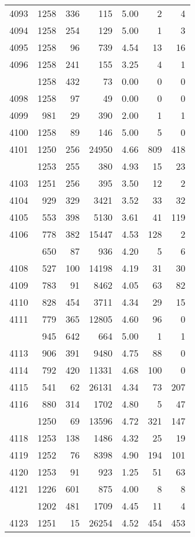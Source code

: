 \documentclass[
]{article}
\begin{document}
\begin{table}
\begin{tabular}[t]{lrrrrrr}
4093 & 1258 & 336 & 115 & 5.00 & 2 & 4\\
4094 & 1258 & 254 & 129 & 5.00 & 1 & 3\\
4095 & 1258 & 96 & 739 & 4.54 & 13 & 16\\
4096 & 1258 & 241 & 155 & 3.25 & 4 & 1\\
\addlinespace
4097 & 1258 & 432 & 73 & 0.00 & 0 & 0\\
4098 & 1258 & 97 & 49 & 0.00 & 0 & 0\\
4099 & 981 & 29 & 390 & 2.00 & 1 & 1\\
4100 & 1258 & 89 & 146 & 5.00 & 5 & 0\\
4101 & 1250 & 256 & 24950 & 4.66 & 809 & 418\\
\addlinespace
4102 & 1253 & 255 & 380 & 4.93 & 15 & 23\\
4103 & 1251 & 256 & 395 & 3.50 & 12 & 2\\
4104 & 929 & 329 & 3421 & 3.52 & 33 & 32\\
4105 & 553 & 398 & 5130 & 3.61 & 41 & 119\\
4106 & 778 & 382 & 15447 & 4.53 & 128 & 2\\
\addlinespace
4107 & 650 & 87 & 936 & 4.20 & 5 & 6\\
4108 & 527 & 100 & 14198 & 4.19 & 31 & 30\\
4109 & 783 & 91 & 8462 & 4.05 & 63 & 82\\
4110 & 828 & 454 & 3711 & 4.34 & 29 & 15\\
4111 & 779 & 365 & 12805 & 4.60 & 96 & 0\\
\addlinespace
4112 & 945 & 642 & 664 & 5.00 & 1 & 1\\
4113 & 906 & 391 & 9480 & 4.75 & 88 & 0\\
4114 & 792 & 420 & 11331 & 4.68 & 100 & 0\\
4115 & 541 & 62 & 26131 & 4.34 & 73 & 207\\
4116 & 880 & 314 & 1702 & 4.80 & 5 & 47\\
\addlinespace
4117 & 1250 & 69 & 13596 & 4.72 & 321 & 147\\
4118 & 1253 & 138 & 1486 & 4.32 & 25 & 19\\
4119 & 1252 & 76 & 8398 & 4.90 & 194 & 101\\
4120 & 1253 & 91 & 923 & 1.25 & 51 & 63\\
4121 & 1226 & 601 & 875 & 4.00 & 8 & 8\\
\addlinespace
4122 & 1202 & 481 & 1709 & 4.45 & 11 & 4\\
4123 & 1251 & 15 & 26254 & 4.52 & 454 & 453\\

\end{tabular}
\end{table}
\end{document}
